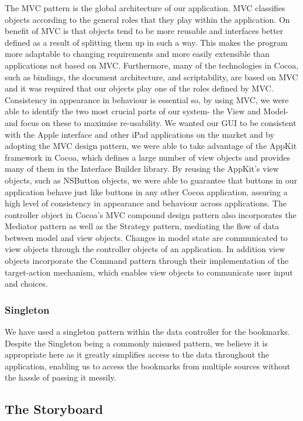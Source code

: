 \documentclass[a4wide, 10pt]{article}
\begin{document}
The MVC pattern is the global architecture of our application. MVC classifies objects according to the general roles that they play within the application. On benefit of MVC is that objects tend to be more reusable and interfaces better defined as a result of splitting them up in such a way. This makes the program more adaptable to changing requirements and more easily extensible than applications not based on MVC. Furthermore, many of the technologies in Cocoa, such as bindings, the document architecture, and scriptability, are based on MVC and it was required that our objects play one of the roles defined by MVC. Consistency in appearance in behaviour is essential so, by using MVC, we were able to identify the two most crucial parts of our system- the View and Model- and focus on these to maximise re-usability.  We wanted our GUI to be consistent with the Apple interface and other iPad applications on the market and by adopting the MVC design pattern, we were able to take advantage of the AppKit framework in Cocoa, which defines a large number of view objects and provides many of them in the Interface Builder library. By reusing the AppKit's view objects, such as NSButton objects, we were able to guarantee that buttons in our application behave just like buttons in any other Cocoa application, assuring a high level of consistency in appearance and behaviour across applications. The controller object in Cocoa's MVC compound design pattern also incorporates the Mediator pattern as well as the Strategy pattern, mediating the flow of data between model and view objects. Changes in model state are communicated to view objects through the controller objects of an application. In addition view objects incorporate the Command pattern through their implementation of the target-action mechanism, which enables view objects to communicate user input and choices.

\subsubsection{Singleton}
We have used a singleton pattern within the data controller for the bookmarks. Despite the Singleton being a commonly misused pattern, we believe it is appropriate here as it greatly simplifies access to the data throughout the application, enabling us to access the bookmarks from multiple sources without the hassle of passing it messily. 

\subsection{The Storyboard}
\end{document}
